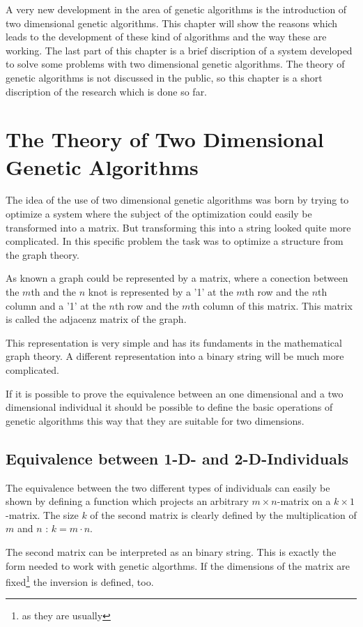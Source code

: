 A very new development in the area of genetic algorithms is the introduction
of two dimensional genetic algorithms. This chapter will show the reasons which
leads to the development of these kind of algorithms and the way these are
working. The last part of this chapter is a brief discription of a system developed
to solve some problems with two dimensional genetic algorithms. The theory of
genetic algorithms is not discussed in the public, so this chapter is a short
discription of the research which is done so far.

\section{The Theory of Two Dimensional Genetic Algorithms}
The idea of the use of two dimensional genetic algorithms was born by trying
to optimize a system where the subject of the optimization could easily be transformed
into a matrix. But transforming this into a string looked quite more complicated.
In this specific problem the task was to optimize a structure from the graph theory.

As known a graph could be represented by a matrix, where a conection between
the $m$th and the $n$ knot is represented by a '1' at the $m$th row and the
$n$th column and a '1' at the $n$th row and the $m$th column of this matrix.
This matrix is called the adjacenz matrix of the graph.

This representation is very simple and has its fundaments in the mathematical
graph theory. A different representation into a binary string will be much more
complicated.

If it is possible to prove the equivalence between an one dimensional and a two
dimensional individual it should be possible to define the basic operations of
genetic algorithms this way that they are suitable for two dimensions.

\subsection{Equivalence between 1-D- and 2-D-Individuals}
The equivalence between the two different types of individuals can easily be shown
by defining a function which projects an arbitrary $m \times n$-matrix on a
$k \times 1$-matrix. The size $k$ of the second matrix is clearly defined by
the multiplication of $m$ and $n$ : $k = m \cdot n$.

The second matrix can be interpreted as an binary string. This is exactly the
form needed to work with genetic algorthms. If the dimensions of the matrix are
fixed\footnote{as they are usually} the inversion is defined, too.

